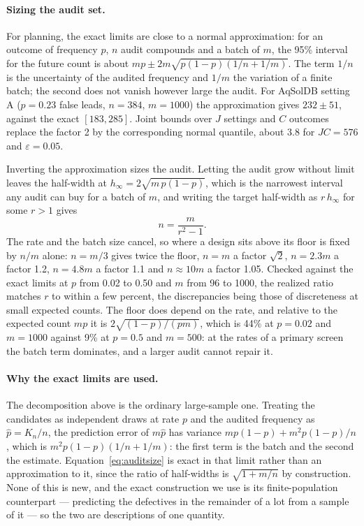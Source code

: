 \documentclass[10pt]{article}
\begin{document}
\paragraph{Sizing the audit set.} For planning, the exact limits are close to a normal approximation: for an outcome of frequency $p$, $n$ audit compounds and a batch of $m$, the 95\% interval for the future count is about $mp\pm2m\sqrt{p(1-p)(1/n+1/m)}$. The term $1/n$ is the uncertainty of the audited frequency and $1/m$ the variation of a finite batch; the second does not vanish however large the audit. For AqSolDB setting A ($p=0.23$ false leads, $n=384$, $m=1000$) the approximation gives $232\pm51$, against the exact $[183,285]$. Joint bounds over $J$ settings and $C$ outcomes replace the factor 2 by the corresponding normal quantile, about 3.8 for $JC=576$ and $\varepsilon=0.05$.

Inverting the approximation sizes the audit. Letting the audit grow without limit leaves the half-width at $h_\infty=2\sqrt{m\,p(1-p)}$, which is the narrowest interval any audit can buy for a batch of $m$, and writing the target half-width as $r\,h_\infty$ for some $r>1$ gives
\begin{equation}
n = \frac{m}{r^2-1}.
\label{eq:auditsize}
\end{equation}
The rate and the batch size cancel, so where a design sits above its floor is fixed by $n/m$ alone: $n=m/3$ gives twice the floor, $n=m$ a factor $\sqrt2$, $n=2.3m$ a factor 1.2, $n=4.8m$ a factor 1.1 and $n\approx10m$ a factor 1.05. Checked against the exact limits at $p$ from 0.02 to 0.50 and $m$ from 96 to 1000, the realized ratio matches $r$ to within a few percent, the discrepancies being those of discreteness at small expected counts. The floor does depend on the rate, and relative to the expected count $mp$ it is $2\sqrt{(1-p)/(pm)}$, which is 44\% at $p=0.02$ and $m=1000$ against 9\% at $p=0.5$ and $m=500$: at the rates of a primary screen the batch term dominates, and a larger audit cannot repair it.

\paragraph{Why the exact limits are used.} The decomposition above is the ordinary large-sample one. Treating the candidates as independent draws at rate $p$ and the audited frequency as $\hat p=K_n/n$, the prediction error of $m\hat p$ has variance $mp(1-p)+m^2p(1-p)/n$, which is $m^2p(1-p)(1/n+1/m)$: the first term is the batch and the second the estimate. Equation~\ref{eq:auditsize} is exact in that limit rather than an approximation to it, since the ratio of half-widths is $\sqrt{1+m/n}$ by construction. None of this is new, and the exact construction we use is its finite-population counterpart --- predicting the defectives in the remainder of a lot from a sample of it\citep{Thatcher1964,Wilks1941,DodgeRomig1944} --- so the two are descriptions of one quantity.
\end{document}

